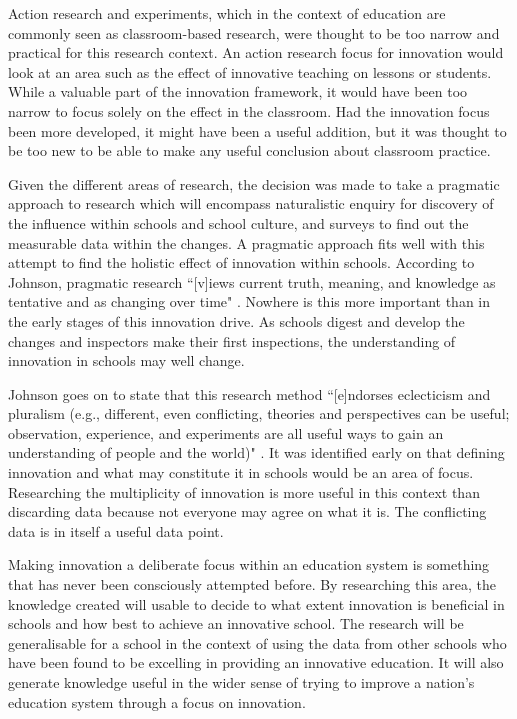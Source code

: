 \documentclass[11pt]{article}
\begin{document}
Action research and experiments, which in the context of education are commonly seen as classroom-based research, were thought to be too narrow and practical for this research context. An action research focus for innovation would look at an area such as the effect of innovative teaching on lessons or students. While a valuable part of the innovation framework, it would have been too narrow to focus solely on the effect in the classroom. Had the innovation focus been more developed, it might have been a useful addition, but it was thought to be too new to be able to make any useful conclusion about classroom practice.

Given the different areas of research, the decision was made to take a pragmatic approach to research which will encompass naturalistic enquiry for discovery of the influence within schools and school culture, and surveys to find out the measurable data within the changes.  A pragmatic approach fits well with this attempt to find the holistic effect of innovation within schools. According to Johnson, pragmatic research ``[v]iews current truth, meaning, and knowledge as tentative and as changing over time" \cite[p. 18]{Johnson_2004}. Nowhere is this more important than in the early stages of this innovation drive. As schools digest and develop the changes and inspectors make their first inspections, the understanding of innovation in schools may well change.

Johnson goes on to state that this research method ``[e]ndorses eclecticism and pluralism (e.g., different, even conflicting, theories and perspectives can be useful; observation, experience, and experiments are all useful ways to gain an understanding of people and the world)" \cite[p. 18]{Johnson_2004}. It was identified early on that defining innovation and what may constitute it in schools would be an area of focus. Researching the multiplicity of innovation is more useful in this context than discarding data because not everyone may agree on what it is. The conflicting data is in itself a useful data point.

Making innovation a deliberate focus within an education system is something that has never been consciously attempted before. By researching this area, the knowledge created will usable to decide to what extent innovation is beneficial in schools and how best to achieve an innovative school. The research will be generalisable for a school in the context of using the data from other schools who have been found to be excelling in providing an innovative education. It will also generate knowledge useful in the wider sense of trying to improve a nation's education system through a focus on innovation. 
\end{document}
